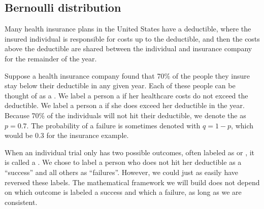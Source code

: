 \subsection{Bernoulli distribution}
\label{bernoulli}

\newcommand{\insureSprob}{0.7}
\newcommand{\insureSperc}{70\%}
\newcommand{\insureFprob}{0.3}
\newcommand{\insureFperc}{30\%}
\newcommand{\insureDistA}{0.7}
\newcommand{\insureDistB}{0.21}
\newcommand{\insureDistC}{0.063}
\newcommand{\insureDistD}{0.019}
\newcommand{\insureDistE}{0.006}
\newcommand{\insureCDistA}{0.7}
\newcommand{\insureCDistB}{0.91}
\newcommand{\insureCDistC}{0.973}
\newcommand{\insureCDistCComplement}{0.027}
\newcommand{\insureCDistD}{0.992}
\newcommand{\insureCDistE}{0.998}
\newcommand{\insureGeomMean}{1.43}


Many health insurance plans in the United States have
a deductible, where the insured individual is responsible
for costs up to the deductible, and then the costs above
the deductible are shared between the individual and
insurance company for the remainder of the year.

Suppose a health insurance company found that \insureSperc{} of the
people they insure stay below their deductible in any given year.
Each of these people can be thought of as a .
We label a person a  if her healthcare costs
do not exceed the deductible.
We label a person a  if she does exceed her
deductible in the year.
Because 70\% of the individuals will not hit their deductible,
we denote the  as
$p = \insureSprob{}$.
The probability of a failure is sometimes denoted with
$q = 1 - p$, which would be \insureFprob{} for the insurance
example.

When an individual trial only has two possible outcomes, often
labeled as  or , it is called a
.
We chose to label a person who does not hit her deductible
as a ``success'' and all others as ``failures''.
However, we could just as easily have reversed these labels.
The mathematical framework we will build does not depend
on which outcome is labeled a success and which a failure,
as long as we are consistent.

